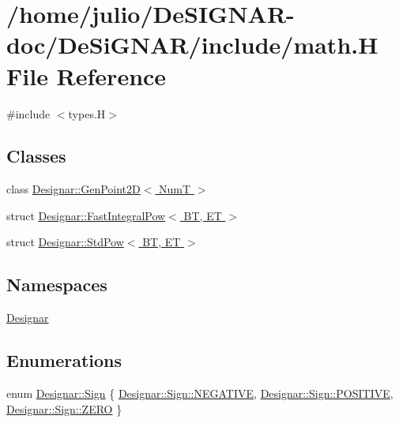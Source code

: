 \hypertarget{math_8_h}{}\section{/home/julio/\+De\+S\+I\+G\+N\+A\+R-\/doc/\+De\+Si\+G\+N\+A\+R/include/math.H File Reference}
\label{math_8_h}
{\ttfamily \#include $<$types.\+H$>$}\newline
\subsection*{Classes}
\begin{DoxyCompactItemize}
\item 
class \hyperlink{class_designar_1_1_gen_point2_d}{Designar\+::\+Gen\+Point2\+D$<$ Num\+T $>$}
\item 
struct \hyperlink{struct_designar_1_1_fast_integral_pow}{Designar\+::\+Fast\+Integral\+Pow$<$ B\+T, E\+T $>$}
\item 
struct \hyperlink{struct_designar_1_1_std_pow}{Designar\+::\+Std\+Pow$<$ B\+T, E\+T $>$}
\end{DoxyCompactItemize}
\subsection*{Namespaces}
\begin{DoxyCompactItemize}
\item 
 \hyperlink{namespace_designar}{Designar}
\end{DoxyCompactItemize}
\subsection*{Enumerations}
\begin{DoxyCompactItemize}
\item 
enum \hyperlink{namespace_designar_aee82690b26e153ff9bcb37b8144b83f4}{Designar\+::\+Sign} \{ \hyperlink{namespace_designar_aee82690b26e153ff9bcb37b8144b83f4a50546bf973283065b6ccf09faf7a580a}{Designar\+::\+Sign\+::\+N\+E\+G\+A\+T\+I\+VE}, 
\hyperlink{namespace_designar_aee82690b26e153ff9bcb37b8144b83f4aab6c31432785221bae58327ef5f6ea58}{Designar\+::\+Sign\+::\+P\+O\+S\+I\+T\+I\+VE}, 
\hyperlink{namespace_designar_aee82690b26e153ff9bcb37b8144b83f4a529e9e0beb5f85d1f132917c1a09860c}{Designar\+::\+Sign\+::\+Z\+E\+RO}
 \}
\end{DoxyCompactItemize}
